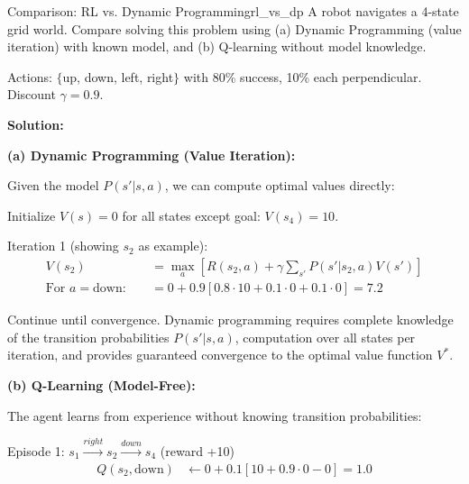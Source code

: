 \begin{example}{Comparison: RL vs. Dynamic Programming}{rl_vs_dp}
A robot navigates a 4-state grid world. Compare solving this problem using (a) Dynamic Programming (value iteration) with known model, and (b) Q-learning without model knowledge.

\begin{center}
\end{center}

Actions: $\{$up, down, left, right$\}$ with 80\% success, 10\% each perpendicular. Discount $\gamma = 0.9$.

\tcblower
\textbf{Solution:}

\textbf{(a) Dynamic Programming (Value Iteration):}

Given the model $P(s'|s,a)$, we can compute optimal values directly:

Initialize $V(s) = 0$ for all states except goal: $V(s_4) = 10$.

Iteration 1 (showing $s_2$ as example):
\begin{align}
V(s_2) &= \max_a \left[ R(s_2, a) + \gamma \sum_{s'} P(s'|s_2, a) V(s') \right] \\
\text{For } a = \text{down}: \quad &= 0 + 0.9 [0.8 \cdot 10 + 0.1 \cdot 0 + 0.1 \cdot 0] = 7.2
\end{align}

Continue until convergence. Dynamic programming requires complete knowledge of the transition probabilities $P(s'|s,a)$, computation over all states per iteration, and provides guaranteed convergence to the optimal value function $V^*$.

\textbf{(b) Q-Learning (Model-Free):}

The agent learns from experience without knowing transition probabilities:

Episode 1: $s_1 \xrightarrow{right} s_2 \xrightarrow{down} s_4$ (reward +10)
\begin{align}
Q(s_2, \text{down}) &\leftarrow 0 + 0.1[10 + 0.9 \cdot 0 - 0] = 1.0
\end{align}


\end{example}
